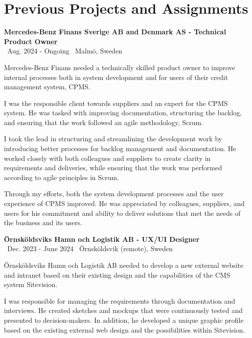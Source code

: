 \documentclass[a4paper,10pt]{article}
\begin{document}
\vspace{0.5cm}

\section*{Previous Projects and Assignments}

\textbf{Mercedes-Benz Finans Sverige AB and Denmark AS - Technical Product Owner}\\
\normalsize \faCalendar \ Aug. 2024 - Ongoing \quad \faMapMarker \ Malmö, Sweden

Mercedes-Benz Finans needed a technically skilled product owner to improve internal processes both in system development and for users of their credit management system, CPMS.

I was the responsible client towards suppliers and an expert for the CPMS system. He was tasked with improving documentation, structuring the backlog, and ensuring that the work followed an agile methodology, Scrum.

I took the lead in structuring and streamlining the development work by introducing better processes for backlog management and documentation. He worked closely with both colleagues and suppliers to create clarity in requirements and deliveries, while ensuring that the work was performed according to agile principles in Scrum.

Through my efforts, both the system development processes and the user experience of CPMS improved. He was appreciated by colleagues, suppliers, and users for his commitment and ability to deliver solutions that met the needs of the business and its users.

\vspace{0.5cm}
\textbf{Örnsköldsviks Hamn och Logistik AB - UX/UI Designer}\\
\normalsize \faCalendar \ Dec. 2023 - June 2024 \quad \faMapMarker \ Örnsköldsvik (remote), Sweden

Örnsköldsviks Hamn och Logistik AB needed to develop a new external website and intranet based on their existing design and the capabilities of the CMS system Sitevision.

I was responsible for managing the requirements through documentation and interviews. He created sketches and mockups that were continuously tested and presented to decision-makers. In addition, he developed a unique graphic profile based on the existing external web design and the possibilities within Sitevision.
\end{document}
